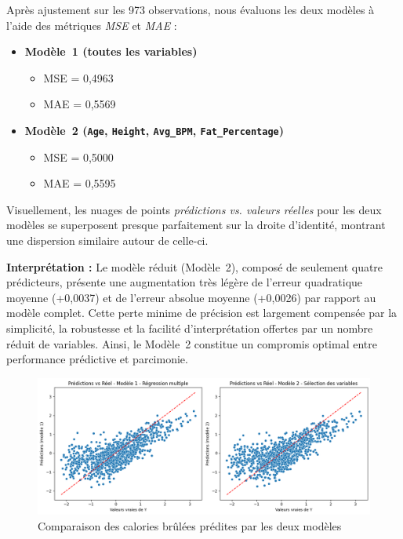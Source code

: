 \documentclass[12pt,a4paper]{article}
\begin{document}
Après ajustement sur les 973 observations, nous évaluons les deux modèles à l’aide des métriques \textit{MSE} et \textit{MAE} :

\begin{itemize}
  \item \textbf{Modèle~1 (toutes les variables)}  
    \begin{itemize}
      \item MSE = 0,4963  
      \item MAE = 0,5569  
    \end{itemize}

  \item \textbf{Modèle~2 (\texttt{Age}, \texttt{Height}, \texttt{Avg\_BPM}, \texttt{Fat\_Percentage})}  
    \begin{itemize}
      \item MSE = 0,5000  
      \item MAE = 0,5595  
    \end{itemize}
\end{itemize}

Visuellement, les nuages de points \emph{prédictions vs. valeurs réelles} pour les deux modèles se superposent presque parfaitement sur la droite d’identité, montrant une dispersion similaire autour de celle-ci.

\bigskip

\noindent\textbf{Interprétation :}  
Le modèle réduit (Modèle~2), composé de seulement quatre prédicteurs, présente une augmentation très légère de l’erreur quadratique moyenne (+0,0037) et de l’erreur absolue moyenne (+0,0026) par rapport au modèle complet. Cette perte minime de précision est largement compensée par la simplicité, la robustesse et la facilité d’interprétation offertes par un nombre réduit de variables. Ainsi, le Modèle~2 constitue un compromis optimal entre performance prédictive et parcimonie.

\begin{figure}[H]
  \centering
  \includegraphics[width=0.7\linewidth]{prediction.png}
  \caption{Comparaison des calories brûlées prédites par les deux modèles}
\end{figure}
\end{document}
